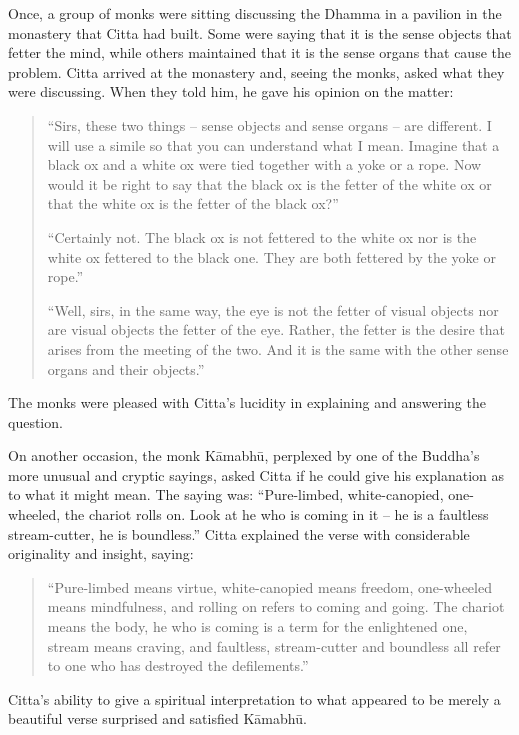 Once, a group of monks were sitting discussing the Dhamma in a pavilion
in the monastery that Citta had built. Some were saying that it is the
sense objects that fetter the mind, while others maintained that it is
the sense organs that cause the problem. Citta arrived at the monastery
and, seeing the monks, asked what they were discussing. When they told
him, he gave his opinion on the matter:

\begin{quote}
``Sirs, these two things -- sense objects and sense organs -- are
different. I will use a simile so that you can understand what I mean.
Imagine that a black ox and a white ox were tied together with a yoke or
a rope. Now would it be right to say that the black ox is the fetter of
the white ox or that the white ox is the fetter of the black ox?''

``Certainly not. The black ox is not fettered to the white ox nor is the
white ox fettered to the black one. They are both fettered by the yoke
or rope.''

``Well, sirs, in the same way, the eye is not the fetter of visual
objects nor are visual objects the fetter of the eye. Rather, the fetter
is the desire that arises from the meeting of the two. And it is the
same with the other sense organs and their objects.''
\end{quote}

The monks were pleased with Citta's lucidity in explaining and answering
the question.

On another occasion, the monk Kāmabhū, perplexed by one of the Buddha's
more unusual and cryptic sayings, asked Citta if he could give his
explanation as to what it might mean. The saying was: ``Pure-limbed,
white-canopied, one-wheeled, the chariot rolls on. Look at he who is
coming in it -- he is a faultless stream-cutter, he is boundless.''
Citta explained the verse with considerable originality and insight,
saying:

\begin{quote}
``Pure-limbed means virtue, white-canopied means freedom, one-wheeled
means mindfulness, and rolling on refers to coming and going. The
chariot means the body, he who is coming is a term for the enlightened
one, stream means craving, and faultless, stream-cutter and boundless
all refer to one who has destroyed the defilements.''
\end{quote}

Citta's ability to give a spiritual interpretation to what appeared to
be merely a beautiful verse surprised and satisfied Kāmabhū.

